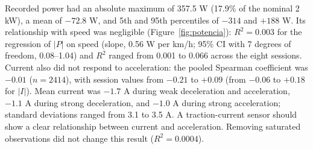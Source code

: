 \documentclass[vehicles,article,submit,moreauthors]{Definitions/mdpi}
\begin{document}
Recorded power had an absolute maximum of 357.5 W (17.9\% of the nominal 2 kW), a mean of $-72.8$ W, and 5th and 95th percentiles of $-314$ and $+188$ W. Its relationship with speed was negligible (Figure~\ref{fig:potencia}): $R^2=0.003$ for the regression of $|P|$ on speed (slope, 0.56 W per km/h; 95\% CI with 7 degrees of freedom, 0.08--1.04) and $R^2$ ranged from 0.001 to 0.066 across the eight sessions. Current also did not respond to acceleration: the pooled Spearman coefficient was $-0.01$ ($n=2414$), with session values from $-0.21$ to $+0.09$ (from $-0.06$ to $+0.18$ for $|I|$). Mean current was $-1.7$ A during weak deceleration and acceleration, $-1.1$ A during strong deceleration, and $-1.0$ A during strong acceleration; standard deviations ranged from 3.1 to 3.5 A. A traction-current sensor should show a clear relationship between current and acceleration. Removing saturated observations did not change this result ($R^2=0.0004$).
\end{document}
